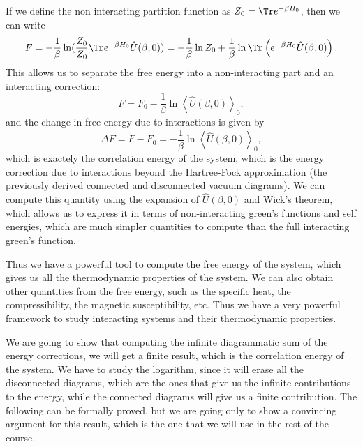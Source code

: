 If we define the non interacting partition function as \(Z_0 = \Tr e^{-\beta H_0}\), then we can write
\[
    F = - \frac{1}{\beta} \ln (\frac{Z_0}{Z_0} \Tr e^{-\beta H_0} \hat{U}(\beta, 0)) = - \frac{1}{\beta} \ln Z_0 + \frac{1}{\beta} \ln \Tr \left( e^{-\beta H_0} \hat{U}(\beta, 0) \right).
\]
This allows us to separate the free energy into a non-interacting part and an interacting correction:
\[
    F = F_0 - \frac{1}{\beta} \ln \left\langle \hat{U}(\beta, 0) \right\rangle_0,
\]
and the change in free energy due to interactions is given by
\[
    \Delta F = F - F_0 = - \frac{1}{\beta} \ln \left\langle \hat{U}(\beta, 0) \right\rangle_0,
\]
which is exactely the correlation energy of the system, which is the energy correction due to interactions beyond the Hartree-Fock approximation (the previously derived connected and disconnected vacuum diagrams). We can compute this quantity using the expansion of \(\hat{U}(\beta, 0)\) and Wick's theorem, which allows us to express it in terms of non-interacting green's functions and self energies, which are much simpler quantities to compute than the full interacting green's function.

Thus we have a powerful tool to compute the free energy of the system, which gives us all the thermodynamic properties of the system. We can also obtain other quantities from the free energy, such as the specific heat, the compressibility, the magnetic susceptibility, etc. Thus we have a very powerful framework to study interacting systems and their thermodynamic properties.

We are going to show that computing the infinite diagrammatic sum of the energy corrections, we will get a finite result, which is the correlation energy of the system. We have to study the logarithm, since it will erase all the disconnected diagrams, which are the ones that give us the infinite contributions to the energy, while the connected diagrams will give us a finite contribution. The following can be formally proved, but we are going only to show a convincing argument for this result, which is the one that we will use in the rest of the course.

